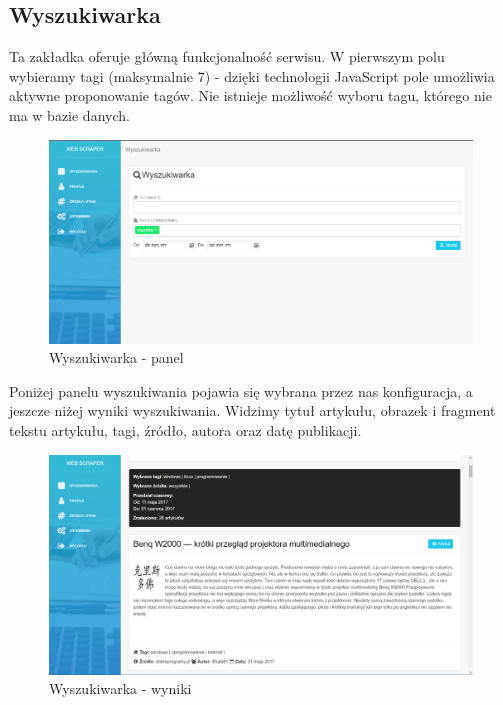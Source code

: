 \documentclass[12pt, titlepage]{article}
\begin{document}
	\newpage
	\subsection{Wyszukiwarka}
	Ta zakładka oferuje główną funkcjonalność serwisu. W pierwszym polu wybieramy tagi (maksymalnie 7) - dzięki technologii JavaScript pole umożliwia aktywne proponowanie tagów.
	Nie istnieje możliwość wyboru tagu, którego nie ma w bazie danych.
	\begin{figure}[H]
	\centering
	\includegraphics[scale=0.45]{obrazki/wyszukiwarka.png}
	\caption{Wyszukiwarka - panel}
	\label{fig:db_schema}
	\end{figure}
	\newpage
	Poniżej panelu wyszukiwania pojawia się wybrana przez nas konfiguracja, a jeszcze niżej wyniki wyszukiwania. Widzimy tytuł artykułu, obrazek i fragment tekstu artykułu, tagi, źródło, autora oraz datę publikacji.
	\begin{figure}[H]
		\centering
		\includegraphics[scale=0.27]{obrazki/wyszukiwarka2.png}
		\caption{Wyszukiwarka - wyniki}
		\label{fig:db_schema}
	\end{figure}


	\newpage
\end{document}
